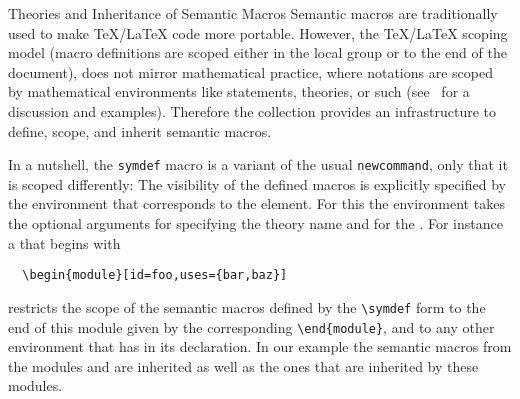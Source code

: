 \begin{omgroup}[id=stex,creators=miko]
\begin{omgroup}{Theories and Inheritance of Semantic Macros}
  Semantic macros are traditionally used to make {\TeX/\LaTeX} code more
  portable. However, the {\TeX/\LaTeX} scoping model (macro definitions are scoped either
  in the local group or to the end of the document), does not mirror mathematical
  practice, where notations are scoped by mathematical environments like statements,
  theories, or such (see~\cite{Kohlhase:smtl05} for a discussion and examples). Therefore
  the {\stex} collection provides an infrastructure to define, scope, and inherit semantic
  macros.

  In a nutshell, the {\stex} {\verb|symdef|} macro is a variant of the usual
  {\verb|newcommand|}, only that it is scoped differently: The visibility of the defined
  macros is explicitly specified by the {} environment that corresponds to
  the {\omdoc} {} element.  For this the {} environment
  takes the optional {} arguments {} for specifying the theory
  name and {} for the {}. For
  instance a {} that begins with
\begin{lstlisting}
  \begin{module}[id=foo,uses={bar,baz}]
\end{lstlisting}
restricts the scope of the semantic macros defined by the {\verb|\symdef|} form to the end of
this module given by the corresponding {\verb|\end{module}|}, and to any other
{} environment that has {\snippet{[uses=\{\ldots,foo,\ldots\}]}} in its
declaration. In our example the semantic macros from the modules {}
and {} are inherited as well as the ones that are inherited by these modules.


\end{omgroup}
\end{omgroup}
